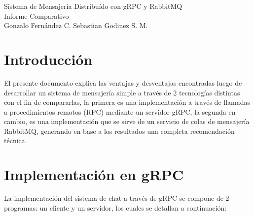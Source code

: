 \documentclass[11pt, letter]{article}
\begin{document}
\begin{center}
	\huge{Sistema de Mensajería Distribuído con gRPC y RabbitMQ}\\
	\LARGE{Informe Comparativo}\\
	\vspace{3mm}
	\large{Gonzalo Fernández C. \hspace{6mm} Sebastian Godinez S. M.}

\end{center}

\section{Introducción}

El presente documento explica las ventajas y desventajas encontradas luego de desarrollar un sistema de mensajería simple a través de 2 tecnologías distintas con el fin de compararlas, la primera es una implementación a través de llamadas a procedimientos remotos (RPC) mediante un servidor gRPC\cite{GRPC}, la segunda en cambio, es una implementación que se sirve de un servicio de colas de mensajería RabbitMQ\cite{RabbitMQ}, generando en base a los resultados una completa recomendación técnica.

\section{Implementación en gRPC}

La implementación del sistema de chat a través de gRPC se compone de 2 programas: un cliente y un servidor, los cuales se detallan a continuación:
\end{document}
